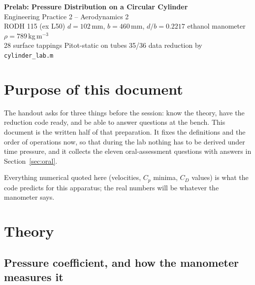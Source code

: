 \documentclass[11pt,a4paper]{article}
\newcommand{\Cp}{\ensuremath{C_p}}
\newcommand{\CD}{\ensuremath{C_D}}
\begin{document}
\begin{center}
{\LARGE\bfseries Prelab: Pressure Distribution on a Circular Cylinder}\\[4pt]
{\large Engineering Practice 2 -- Aerodynamics 2}\\[8pt]
{\small RODH 115 (ex L50) \quad\textbar\quad $d = 102$\,mm, $b = 460$\,mm, $d/b = 0.2217$
\quad\textbar\quad ethanol manometer $\rho = 789$\,kg\,m$^{-3}$}\\[2pt]
{\small 28 surface tappings \quad\textbar\quad Pitot-static on tubes 35/36 \quad\textbar\quad
data reduction by \texttt{cylinder\_lab.m}}
\end{center}

\vspace{2pt}

\section{Purpose of this document}

The handout asks for three things before the session: know the theory, have the reduction code
ready, and be able to answer questions at the bench. This document is the written half of that
preparation. It fixes the definitions and the order of operations now, so that during the lab
nothing has to be derived under time pressure, and it collects the eleven oral-assessment
questions with answers in Section~\ref{sec:oral}.

Everything numerical quoted here (velocities, \Cp{} minima, \CD{} values) is what the code
predicts for this apparatus; the real numbers will be whatever the manometer says.

\section{Theory}

\subsection{Pressure coefficient, and how the manometer measures it}
\end{document}
